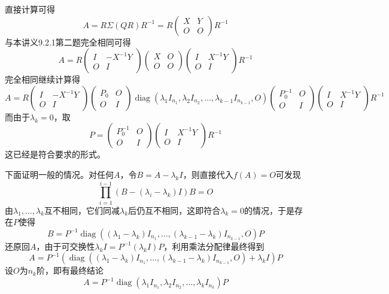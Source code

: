 \documentclass[a4paper,UTF8,fontset=windows]{ctexart}
\DeclareMathOperator{\diag}{diag}
\begin{document}
\begin{enumerate}
    直接计算可得
    $$A=R\Sigma(QR)R^{-1}=R\begin{pmatrix}X&Y\\O&O\end{pmatrix}R^{-1}$$
    与本讲义9.2.1第二题完全相同可得
    $$A=R\begin{pmatrix}I&-X^{-1}Y\\O&I\end{pmatrix}\begin{pmatrix}X&O\\O&O\end{pmatrix}\begin{pmatrix}I&X^{-1}Y\\O&I\end{pmatrix}R^{-1}$$
    完全相同继续计算得
    $$A=R\begin{pmatrix}I&-X^{-1}Y\\O&I\end{pmatrix}\begin{pmatrix}P_0&O\\O&I\end{pmatrix}\diag(\lambda_1I_{n_1},\lambda_2I_{n_2},\dots,\lambda_{k-1}I_{n_{k-1}},O)\begin{pmatrix}P_0^{-1}&O\\O&I\end{pmatrix}\begin{pmatrix}I&X^{-1}Y\\O&I\end{pmatrix}R^{-1}$$
    而由于$\lambda_k=0$，取
    $$P=\begin{pmatrix}P_0^{-1}&O\\O&I\end{pmatrix}\begin{pmatrix}I&X^{-1}Y\\O&I\end{pmatrix}R^{-1}$$
    这已经是符合要求的形式。

    下面证明一般的情况。对任何$A$，令$B=A-\lambda_kI$，则直接代入$f(A)=O$可发现
    $$\prod_{i=1}^{i-1}(B-(\lambda_i-\lambda_k)I)B=O$$
    由$\lambda_1,\dots,\lambda_k$互不相同，它们同减$\lambda_k$后仍互不相同，这即符合$\lambda_k=0$的情况，于是存在$P$使得
    $$B=P^{-1}\diag((\lambda_1-\lambda_k)I_{n_1},\dots,(\lambda_{k-1}-\lambda_k)I_{n_{k-1}},O)P$$
    还原回$A$，由于可交换性$\lambda_kI=P^{-1}(\lambda_kI)P$，利用乘法分配律最终得到
    $$A=P^{-1}(\diag((\lambda_1-\lambda_k)I_{n_1},\dots,(\lambda_{k-1}-\lambda_k)I_{n_{k-1}},O)+\lambda_kI)P$$
    设$O$为$n_k$阶，即有最终结论
    $$A=P^{-1}\diag(\lambda_1I_{n_1},\lambda_2I_{n_2},\dots,\lambda_kI_{n_k})P$$
\end{enumerate}
\end{document}

